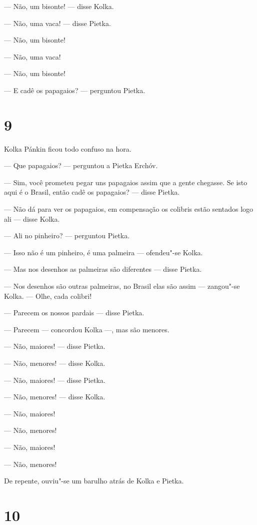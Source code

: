 --- Não, um bisonte! --- disse Kolka.

--- Não, uma vaca! --- disse Pietka.

--- Não, um bisonte!

--- Não, uma vaca!

--- Não, um bisonte!

--- E cadê os papagaios? --- perguntou Pietka.

\section{9}

Kolka Pánkin ficou todo confuso na hora.

--- Que papagaios? --- perguntou a Pietka Erchóv.

--- Sim, você prometeu pegar uns papagaios assim que a gente chegasse.
Se isto aqui é o Brasil, então cadê os papagaios? --- disse Pietka.

--- Não dá para ver os papagaios, em compensação os colibris estão
sentados logo ali --- disse Kolka.

--- Ali no pinheiro? --- perguntou Pietka.

--- Isso não é um pinheiro, é uma palmeira --- ofendeu"-se Kolka.

--- Mas nos desenhos as palmeiras são diferentes --- disse Pietka.

--- Nos desenhos são outras palmeiras, no Brasil elas são assim ---
zangou"-se Kolka. --- Olhe, cada colibri!

--- Parecem os nossos pardais --- disse Pietka.

--- Parecem --- concordou Kolka ---, mas são menores.

--- Não, maiores! --- disse Pietka.

--- Não, menores! --- disse Kolka.

--- Não, maiores! --- disse Pietka.

--- Não, menores! --- disse Kolka.

--- Não, maiores!

--- Não, menores!

--- Não, maiores!

--- Não, menores!

De repente, ouviu"-se um barulho atrás de Kolka e Pietka.

\section{10}

